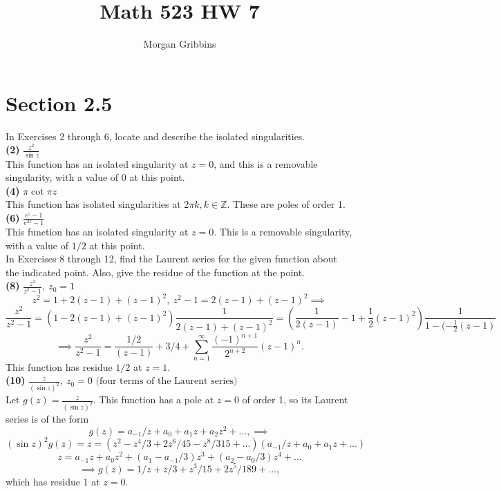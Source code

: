 \documentclass[12pt,letterpaper]{article}
\title{Math 523 HW 7}
\author{Morgan Gribbins}
\date{}
\begin{document}
	
\maketitle

\section*{Section 2.5}
In Exercises 2 through 6, locate and describe the isolated singularities.\\

\textbf{(2)} \(\frac{z^{2}}{\sin z}\) \\

This function has an isolated singularity at \(z=0\), and this is a removable singularity, with a value of \(0\) at this point. \\

\textbf{(4)} \(\pi \cot \pi z\) \\

This function has isolated singularities at \(2\pi k, k\in \mathbb{Z}\). These are poles of order 1. \\

\textbf{(6)} \(\frac{e^{z}-1}{e^{2z}-1}\) \\

This function has an isolated singularity at \(z=0\). This is a removable singularity, with a value of \(1/2\) at this point. \\

In Exercises 8 through 12, find the Laurent series for the given function about the indicated point. Also, give the residue of the function at the point. \\

\textbf{(8)} \(\frac{z^{2}}{z^{2}-1},\ z_{0} = 1\) \\

\[z^{2} = 1 + 2(z-1) + (z-1)^{2},\ z^{2}-1 = 2(z-1) + (z-1)^{2} \implies\] \[\frac{z^{2}}{z^{2}-1} = (1-2(z-1)+(z-1)^{2})\frac{1}{2(z-1) + (z-1)^{2}} = \left(\frac{1}{2(z-1)} - 1 + \frac{1}{2}(z-1)^{2}\right)\frac{1}{1-(-\frac{1}{2}(z-1)}\] \[\implies \frac{z^{2}}{z^{2}-1} = \frac{1/2}{(z-1)} + 3/4 + \sum_{n=1}^{\infty} \frac{(-1)^{n+1}}{2^{n+2}}(z-1)^{n}.\] This function has residue \(1/2\) at \(z=1\). \\

\textbf{(10)} \(\frac{z}{(\sin z )^{2}},\ z_{0} = 0 \text{ (four terms of the Laurent series)}\) \\

Let \(g(z) = \frac{z}{(\sin z)^{2}}\). This function has a pole at \(z = 0\) of order 1, so its Laurent series is of the form \[g(z) = a_{-1}/z + a_{0} + a_{1}z + a_{2}z^{2} + ..., \implies\] \[(\sin z)^{2} g(z) = z = (z^{2} - z^{4}/3 + 2z^{6}/45 - z^{8}/315 + ...)(a_{-1}/z + a_{0} + a_{1}z + ...)\] \[z = a_{-1}z + a_{0}z^{2} + (a_{1}-a_{-1}/3)z^{3} + (a_{2} - a_{0}/3)z^{4} + ...\] \[\implies g(z) = 1/z + z/3 + z^{3}/15 + 2z^{5}/189 + ...,\] which has residue \(1\) at \(z=0\). \\
\end{document}
